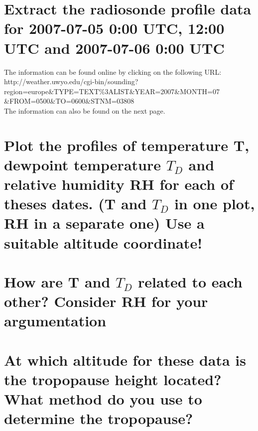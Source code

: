 \documentclass{article}
\begin{document}
\section{Extract the radiosonde profile data for 2007-07-05 0:00 UTC, 12:00 UTC and 2007-07-06 0:00 UTC}
The information can be found online by clicking on the following URL:\\
http://weather.uwyo.edu/cgi-bin/sounding?region=europe\&TYPE=TEXT\%3ALIST\&YEAR=2007\&MONTH=07\\
\&FROM=0500\&TO=0600\&STNM=03808\\

The information can also be found on the next page.



\newpage
\section{Plot the profiles of temperature T, dewpoint temperature $T_D$ and relative humidity RH for each of theses dates. (T and $T_D$ in one plot, RH in a separate one) Use a suitable altitude coordinate!}



\newpage
\section{How are T and $T_D$ related to each other? Consider RH for your argumentation}



\newpage
\section{At which altitude for these data is the tropopause height located?What method do you use to determine the tropopause?}
\end{document}
